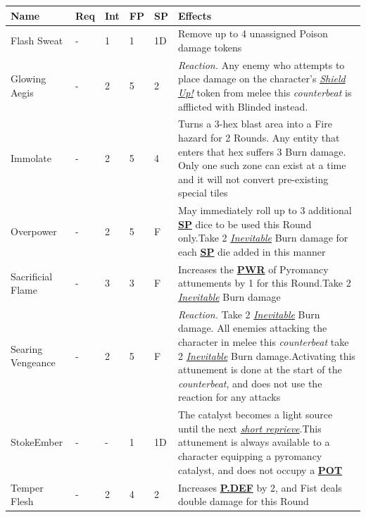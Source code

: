 \documentclass[12pt]{article}
\newcommand{\refto}[1]{\hyperlink{#1}{\textbf{#1}}}
\newcommand{\reftoit}[1]{\hyperlink{#1}{\emph{#1}}}
\begin{document}
\begin{center}
\begin{tabularx}{\textwidth}{p{}p{}p{}p{}p{}p{}}
\hline
\textbf{Name} & \textbf{Req} & \textbf{Int} & \textbf{FP} & \textbf{SP} & \textbf{Effects} \\
\hline
Flash Sweat & - & 1 & 1 & 1D & Remove up to 4 unassigned Poison damage tokens \\
Glowing Aegis & - & 2 & 5 & 2 & \emph{Reaction.} Any enemy who attempts to place damage on the character’s \reftoit{Shield Up!} token from melee this \emph{counterbeat} is afflicted with Blinded instead.\\
Immolate & - & 2 & 5 & 4 & Turns a 3-hex blast area into a Fire hazard for 2 Rounds. Any entity that enters that hex suffers 3 Burn damage. Only one such zone can exist at a time and it will not convert pre-existing special tiles \\
Overpower & - & 2 & 5 & F & May immediately roll up to 3 additional \refto{SP} dice to be used this Round only.\newline Take 2 \reftoit{Inevitable} Burn damage for each \refto{SP} die added in this manner\\
Sacrificial Flame & - & 3 & 3 & F & Increases the \refto{PWR} of Pyromancy attunements by 1 for this Round.\newline Take 2 \reftoit{Inevitable} Burn damage\\
Searing Vengeance & - & 2 & 5 & F & \emph{Reaction.} Take 2 \reftoit{Inevitable} Burn damage. All enemies attacking the character in melee this \emph{counterbeat} take 2 \reftoit{Inevitable} Burn damage.\newline Activating this attunement is done at the start of the \emph{counterbeat}, and does not use the reaction for any attacks\\
Stoke\newline Ember & - & - & 1 & 1D & The catalyst becomes a light source until the next \reftoit{short reprieve}.\newline This attunement is always available to a character equipping a pyromancy catalyst, and does not occupy a \refto{POT} \\
Temper Flesh & - & 2 & 4 & 2 & Increases \refto{P.DEF} by 2, and Fist deals double damage for this Round \\
\hline
\end{tabularx}
\end{center}
\end{document}
